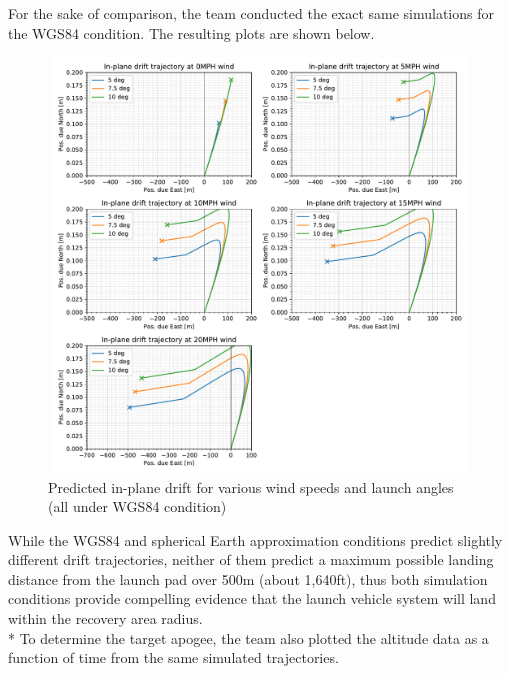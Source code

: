 \newline
For the sake of comparison, the team conducted the exact same simulations for the WGS84 condition. The resulting plots are shown below.
\FloatBarrier
\begin{figure}[h]
    \centering
    \includegraphics[width = 15cm, height = 11cm]{img/FIDO/InPlaneDriftWGS.pdf}
    \caption{Predicted in-plane drift for various wind speeds and launch angles (all under WGS84 condition)}
    \label{fig:my_label}
\end{figure}
\FloatBarrier
While the WGS84 and spherical Earth approximation conditions predict slightly different drift trajectories, neither of them predict a maximum possible landing distance from the launch pad over 500m (about 1,640ft), thus both simulation conditions provide compelling evidence that the launch vehicle system will land within the recovery area radius.
\\*
\newline
To determine the target apogee, the team also plotted the altitude data as a function of time from the same simulated trajectories.
